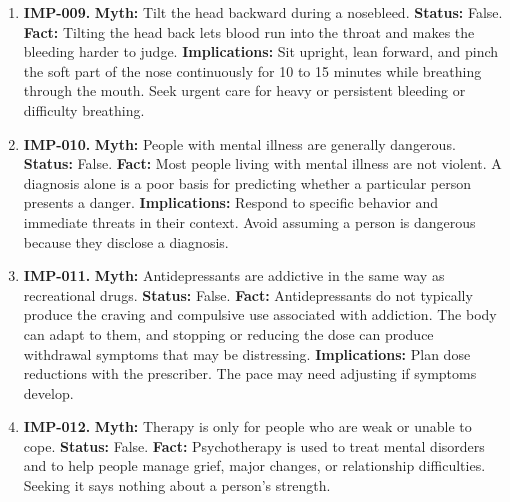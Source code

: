 \documentclass[11pt,oneside]{book}
\begin{document}
\begin{enumerate}[leftmargin=0pt,labelwidth=0pt,labelsep=0pt,itemindent=0pt]
\textbf{Implications:} Start caring for teeth when the first one appears. Have tooth pain, swelling, or visible decay assessed.
\item[] \textbf{IMP-009.} \textbf{Myth:} Tilt the head backward during a nosebleed.\newline
\textbf{Status:} False.\newline
\textbf{Fact:} Tilting the head back lets blood run into the throat and makes the bleeding harder to judge. \cite{ref181}\newline
\textbf{Implications:} Sit upright, lean forward, and pinch the soft part of the nose continuously for 10 to 15 minutes while breathing through the mouth. Seek urgent care for heavy or persistent bleeding or difficulty breathing.
\item[] \textbf{IMP-010.} \textbf{Myth:} People with mental illness are generally dangerous.\newline
\textbf{Status:} False.\newline
\textbf{Fact:} Most people living with mental illness are not violent. A diagnosis alone is a poor basis for predicting whether a particular person presents a danger. \cite{ref399}\newline
\textbf{Implications:} Respond to specific behavior and immediate threats in their context. Avoid assuming a person is dangerous because they disclose a diagnosis.
\item[] \textbf{IMP-011.} \textbf{Myth:} Antidepressants are addictive in the same way as recreational drugs.\newline
\textbf{Status:} False.\newline
\textbf{Fact:} Antidepressants do not typically produce the craving and compulsive use associated with addiction. The body can adapt to them, and stopping or reducing the dose can produce withdrawal symptoms that may be distressing. \cite{ref397}\newline
\textbf{Implications:} Plan dose reductions with the prescriber. The pace may need adjusting if symptoms develop.
\item[] \textbf{IMP-012.} \textbf{Myth:} Therapy is only for people who are weak or unable to cope.\newline
\textbf{Status:} False.\newline
\textbf{Fact:} Psychotherapy is used to treat mental disorders and to help people manage grief, major changes, or relationship difficulties. Seeking it says nothing about a person's strength. \cite{ref400}\newline

\end{enumerate}
\end{document}
